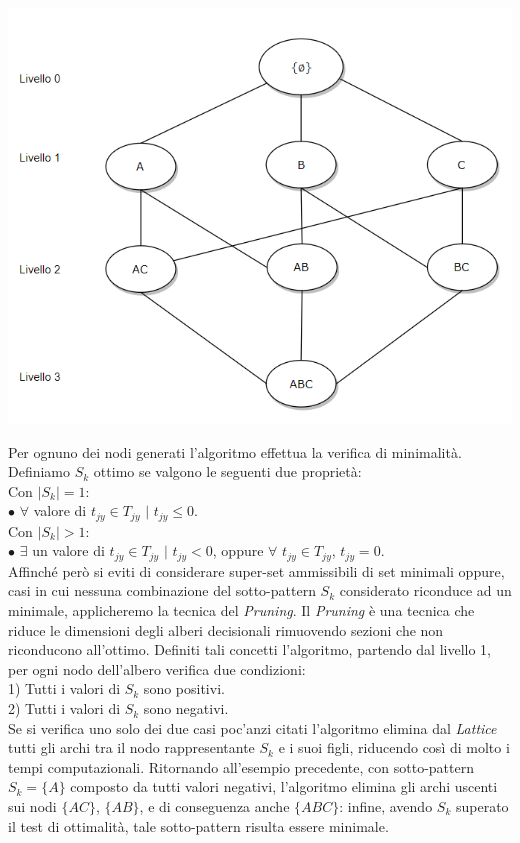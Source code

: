 \begin{center}
	\includegraphics[scale = 0.60]{Immagini/Lattice.png}\\
\end{center}
Per ognuno dei nodi generati l'algoritmo effettua la verifica di minimalità. Definiamo $S_k$ ottimo se valgono le seguenti due proprietà:\\Con $|S_k| = 1$:\\$\bullet$ $\forall$ valore di $t_{jy} \in T_{jy}$ $|$ $t_{jy} \leq 0$.\\Con $|S_k| > 1$:\\ $\bullet$ $\exists$ un valore di $t_{jy} \in T_{jy}$ $|$ $t_{jy} < 0$, oppure $ \forall$  $t_{jy} \in T_{jy}$, $t_{jy}= 0 $.\\ Affinché però si eviti di considerare super-set ammissibili di set minimali oppure, casi in cui nessuna combinazione del sotto-pattern $S_k$ considerato riconduce ad un minimale, applicheremo la tecnica del \emph{Pruning}. Il \emph{Pruning} è una tecnica che riduce le dimensioni degli alberi decisionali rimuovendo sezioni che non riconducono all'ottimo. Definiti tali concetti l'algoritmo, partendo dal livello 1, per ogni nodo dell'albero verifica due condizioni:\\1) Tutti i valori di $S_k$ sono positivi.\\2) Tutti i valori di $S_k$ sono negativi.\\Se si verifica uno solo dei due casi poc'anzi citati l'algoritmo elimina dal \emph{Lattice} tutti gli archi tra il nodo rappresentante $S_k$ e i suoi figli, riducendo così di molto i tempi computazionali. Ritornando all'esempio precedente, con sotto-pattern $S_k = \{A\}$ composto da tutti valori negativi, l'algoritmo elimina gli archi uscenti sui nodi $\{AC\}$, $\{AB\}$, e di conseguenza anche $\{ABC\}$: infine, avendo $S_k$ superato il test di ottimalità, tale sotto-pattern risulta essere minimale.\\
